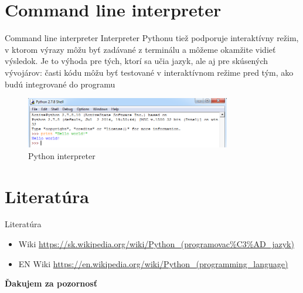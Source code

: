 \documentclass[12pt]{beamer}
\begin{document}
\section{Command line interpreter}
\begin{frame}{Command line interpreter}
    Interpreter Pythonu tiež podporuje interaktívny režim, v ktorom výrazy
    môžu byť zadávané z terminálu a môžeme okamžite vidieť výsledok. Je to
    výhoda pre tých, ktorí sa učia jazyk, ale aj pre skúsených vývojárov: časti
    kódu môžu byť testované v interaktívnom režime pred tým, ako budú
    integrované do programu

    \begin{figure}
        \includegraphics[width=0.8\textwidth]{idle.png}
        \caption{Python interpreter}
        \label{fig3}
    \end{figure}
\end{frame}

\section{Literatúra}
\begin{frame}{Literatúra}
    \begin{itemize}
        \item Wiki \url{https://sk.wikipedia.org/wiki/Python_(programovac\%C3\%AD_jazyk)}
        \item EN Wiki \url{https://en.wikipedia.org/wiki/Python_(programming_language)}
    \end{itemize}
\end{frame}

\begin{frame}
    \begin{center}
        \textbf{Ďakujem za pozornosť}
    \end{center}
\end{frame}
\end{document}
